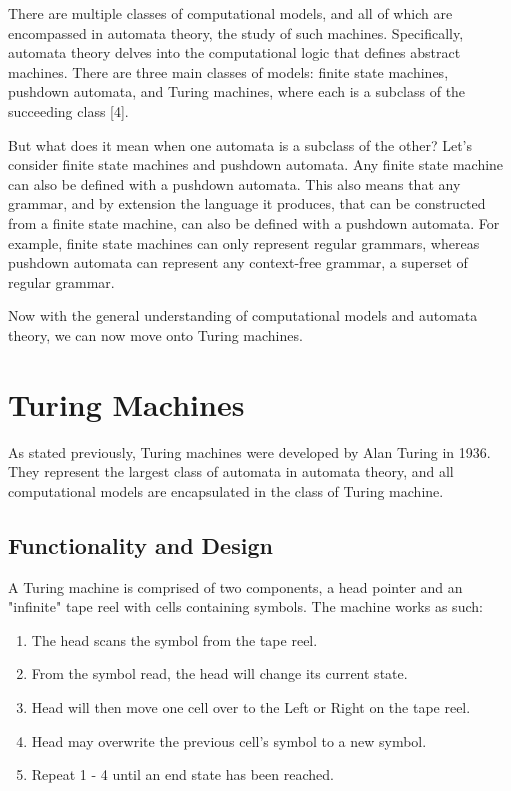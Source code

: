\documentclass[12pt]{article}
\begin{document}
There are multiple classes of computational models, and all of which are encompassed in automata theory, the study of such machines. Specifically, automata theory delves into the computational logic that defines abstract machines. There are three main classes of models: finite state machines, pushdown automata, and Turing machines, where each is a subclass of the succeeding class [4].

But what does it mean when one automata is a subclass of the other? Let's consider finite state machines and pushdown automata. Any finite state machine can also be defined with a pushdown automata. This also means that any grammar, and by extension the language it produces, that can be constructed from a finite state machine, can also be defined with a pushdown automata. For example, finite state machines can only represent regular grammars, whereas pushdown automata can represent any context-free grammar, a superset of regular grammar. 

Now with the general understanding of computational models and automata theory, we can now move onto Turing machines.


\section{Turing Machines}

As stated previously, Turing machines were developed by Alan Turing in 1936. They represent the largest class of automata in automata theory, and all computational models are encapsulated in the class of Turing machine.

\subsection{Functionality and Design}
 A Turing machine is comprised of two components, a head pointer and an "infinite" tape reel with cells containing symbols. The machine works as such: 
\begin{enumerate}

\item The head scans the symbol from the tape reel.
\item From the symbol read, the head will change its current state.
\item Head will then move one cell over to the Left or Right on the tape reel.
\item Head may overwrite the previous cell's symbol to a new symbol.
\item Repeat 1 - 4 until an end state has been reached.

\end{enumerate}
\end{document}
